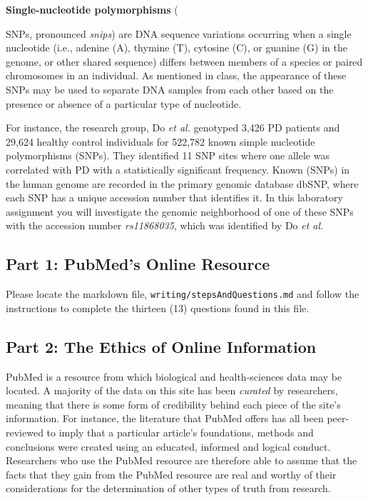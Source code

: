 \textbf{Single-nucleotide polymorphisms} ({SNPs, pronounced \emph{snips}) are DNA sequence variations occurring when a single nucleotide (i.e., adenine (A), thymine (T), cytosine (C), or guanine (G) in the genome, or other shared sequence) differs between members of a species or paired chromosomes in an individual. As mentioned in class, the appearance of these SNPs may be used to separate DNA samples from each other based on the presence or absence of a particular type of nucleotide.

For instance, the research group, Do \emph{et al.} \cite{do2011web} genotyped 3,426 PD patients and 29,624 healthy control individuals for 522,782 known simple nucleotide polymorphisms (SNPs). They identified 11 SNP sites where one allele was correlated with PD with a statistically significant frequency. Known (SNPs) in the human genome are recorded in the primary genomic database dbSNP, where each SNP has a unique accession number that identifies it. In this laboratory assignment you will investigate the genomic neighborhood of one of these SNPs with the accession number \emph{rs11868035}, which was identified by Do \emph{et al.} 


\vspace*{-.2in}

\subsection*{Part 1: PubMed's Online Resource}
\vspace*{-.1in}

Please locate the markdown file, {\tt writing/stepsAndQuestions.md} and follow the instructions to complete the thirteen (13) questions found in this file. 
\vspace*{-.2in}

\subsection*{Part 2: The Ethics of Online Information}
\vspace*{-.1in}

PubMed is a resource from which biological and health-sciences data may be located. A majority of the data on this site has been \emph{curated} by researchers, meaning that there is some form of credibility behind each piece of the site's information. For instance, the literature that PubMed offers has all been peer-reviewed to imply that a particular article's foundations, methods and conclusions were created using an educated, informed and logical conduct. Researchers who use the PubMed resource are therefore able to assume that the facts that they gain from the PubMed resource are real and worthy of their considerations for the determination of other types of truth from research.

}
